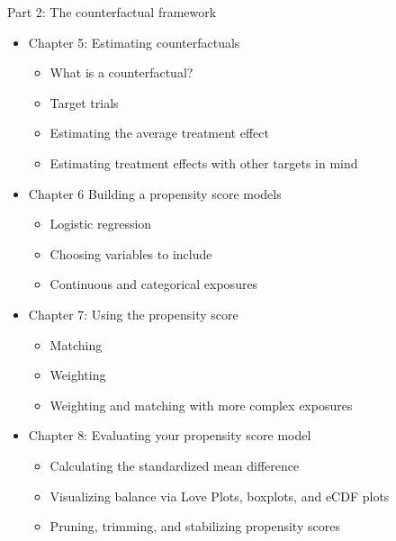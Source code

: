 \documentclass[
]{article}
\providecommand{\tightlist}{%
  \setlength{\itemsep}{0pt}\setlength{\parskip}{0pt}}
\begin{document}
Part 2: The counterfactual framework

\begin{itemize}
\tightlist
\item
  Chapter 5: Estimating counterfactuals

  \begin{itemize}
  \tightlist
  \item
    What is a counterfactual?\\
  \item
    Target trials\\
  \item
    Estimating the average treatment effect\\
  \item
    Estimating treatment effects with other targets in mind
  \end{itemize}
\item
  Chapter 6 Building a propensity score models

  \begin{itemize}
  \tightlist
  \item
    Logistic regression\\
  \item
    Choosing variables to include\\
  \item
    Continuous and categorical exposures
  \end{itemize}
\item
  Chapter 7: Using the propensity score

  \begin{itemize}
  \tightlist
  \item
    Matching\\
  \item
    Weighting\\
  \item
    Weighting and matching with more complex exposures
  \end{itemize}
\item
  Chapter 8: Evaluating your propensity score model

  \begin{itemize}
  \tightlist
  \item
    Calculating the standardized mean difference\\
  \item
    Visualizing balance via Love Plots, boxplots, and eCDF plots\\
  \item
    Pruning, trimming, and stabilizing propensity scores
  \end{itemize}
\end{itemize}
\end{document}
